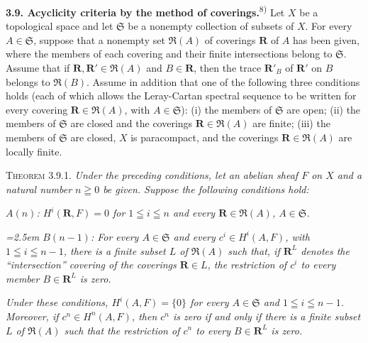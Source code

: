 

\textbf{3.9. Acyclicity criteria by the method of
coverings.}\textsuperscript{8)}
Let $X$ be a topological space and let $\mathfrak S$ be a nonempty collection
of subsets of $X$. For every $A\in\mathfrak S$, suppose that a nonempty set
$\mathfrak R(A)$ of coverings $\mathbf R$ of $A$ has been given, where the
members of each covering and their finite intersections belong to
$\mathfrak S$. Assume that if $\mathbf R,\mathbf R'\in\mathfrak R(A)$ and
$B\in\mathbf R$, then the trace $\mathbf R'_B$ of $\mathbf R'$ on $B$
belongs to $\mathfrak R(B)$.
Assume in addition that one of the following three conditions holds (each of
which allows the Leray-Cartan spectral sequence to be written for every
covering $\mathbf R\in\mathfrak R(A)$, with $A\in\mathfrak S$): (i) the
members of $\mathfrak S$ are open; (ii) the members of $\mathfrak S$ are closed
and the coverings $\mathbf R\in\mathfrak R(A)$ are finite; (iii) the members
of $\mathfrak S$ are closed, $X$ is paracompact, and the coverings
$\mathbf R\in\mathfrak R(A)$ are locally finite.

\textsc{Theorem 3.9.1.} \textit{Under the preceding conditions, let
an abelian sheaf $F$ on $X$ and a natural number $n\geqq0$ be given. Suppose
the following conditions hold:}

\begingroup\itshape
$A(n)$: $H^i(\mathbf R,F)=0$ for $1\leqq i\leqq n$ and every
$\mathbf R\in\mathfrak R(A)$, $A\in\mathfrak S$.\par
\endgroup

\begingroup\itshape\hangindent=2.5em
$B(n-1)$: For every $A\in\mathfrak S$ and every $c^i\in H^i(A,F)$, with
$1\leqq i\leqq n-1$, there is a finite subset $L$ of $\mathfrak R(A)$ such
that, if $\mathbf R^L$ denotes the ``intersection'' covering of the coverings
$\mathbf R\in L$, the restriction of $c^i$ to every member
$B\in\mathbf R^L$ is zero.\par
\endgroup

\noindent\textit{Under these conditions, $H^i(A,F)=\{0\}$ for every
$A\in\mathfrak S$ and $1\leqq i\leqq n-1$. Moreover, if $c^n\in H^n(A,F)$,
then $c^n$ is zero if and only if there is a finite subset $L$ of
$\mathfrak R(A)$ such that the restriction of $c^n$ to every
$B\in\mathbf R^L$ is zero.}

